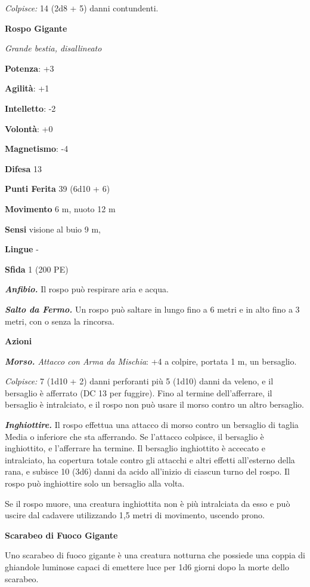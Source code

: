 \begin{multicols}{2}
\emph{Colpisce:} 14 (2d8 + 5) danni contundenti.

\textbf{Rospo Gigante}

\emph{Grande bestia, disallineato}

\textbf{Potenza}: +3

\textbf{Agilità}: +1

\textbf{Intelletto}: -2

\textbf{Volontà}: +0

\textbf{Magnetismo}: -4

\textbf{Difesa} 13

\textbf{Punti Ferita} 39 (6d10 + 6)

\textbf{Movimento} 6 m, nuoto 12 m

\textbf{Sensi} visione al buio 9 m, 

\textbf{Lingue} -

\textbf{Sfida} 1 (200 PE)\smallskip

\emph{\textbf{Anfibio.}} Il rospo può respirare aria e acqua.

\emph{\textbf{Salto da Fermo.}} Un rospo può saltare in lungo fino a 6
metri e in alto fino a 3 metri, con o senza la rincorsa.

\smallskip\textbf{Azioni}

\emph{\textbf{Morso.} Attacco con Arma da Mischia}: +4 a colpire,
portata 1 m, un bersaglio.

\emph{Colpisce:} 7 (1d10 + 2) danni perforanti più 5 (1d10) danni da
veleno, e il bersaglio è afferrato (DC 13 per fuggire). Fino al termine
dell'afferrare, il bersaglio è intralciato, e il rospo non può usare il
morso contro un altro bersaglio.

\emph{\textbf{Inghiottire.}} Il rospo effettua una attacco di morso
contro un bersaglio di taglia Media o inferiore che sta afferrando. Se
l'attacco colpisce, il bersaglio è inghiottito, e l'afferrare ha
termine. Il bersaglio inghiottito è accecato e intralciato, ha copertura
totale contro gli attacchi e altri effetti all'esterno della rana, e
subisce 10 (3d6) danni da acido all'inizio di ciascun turno del rospo.
Il rospo può inghiottire solo un bersaglio alla volta.

Se il rospo muore, una creatura inghiottita non è più intralciata da
esso e può uscire dal cadavere utilizzando 1,5 metri di movimento,
uscendo prono.

\textbf{Scarabeo di Fuoco Gigante}

Uno scarabeo di fuoco gigante è una creatura notturna che possiede una
coppia di ghiandole luminose capaci di emettere luce per 1d6 giorni dopo
la morte dello scarabeo.


\end{multicols}
